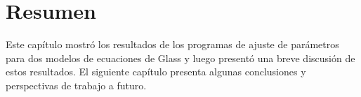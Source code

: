 

\section{Resumen}
Este capítulo mostró los resultados de los programas de ajuste de parámetros para dos modelos de ecuaciones de Glass y luego presentó una breve discusión de estos resultados. El siguiente capítulo presenta algunas conclusiones y perspectivas de trabajo a futuro.

